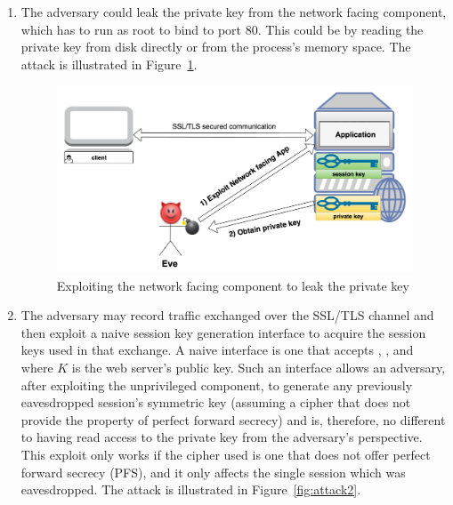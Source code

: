 \documentclass[../main.tex]{subfiles}
\begin{document}
\begin{enumerate}
  \item The adversary could leak the private key from the network facing
    component, which has to run as root to bind to port 80.  This could
    be by reading the private key from disk directly or from the
    process's memory space. The attack is illustrated in
    Figure~\ref{fig:attack1}.

	\begin{figure}[H]
          \centering
          \includegraphics[scale=0.15]{images/attack1.png}
          \caption{Exploiting the network facing component to leak the
            private key}
          \label{fig:attack1}
	\end{figure}

  \item The adversary may record traffic exchanged over the
    SSL/TLS channel and then exploit a naive session key
    generation interface to acquire the session keys used in that
    exchange. A naive interface is one that accepts \crandom,
    \srandom, and \premaster~ where $K$ is the web server's public
    key.  Such an interface allows an adversary, after exploiting
    the unprivileged component, to generate any previously
    eavesdropped session's symmetric key (assuming a cipher that
    does not provide the property of perfect forward secrecy) and
    is, therefore, no different to having read access to the
    private key from the adversary's perspective. This exploit
    only works if the cipher used is one that does not offer
    perfect forward secrecy (PFS), and it only affects the single
    session which was eavesdropped. The attack is illustrated in
    Figure~\ref{fig:attack2}.


\end{enumerate}
\end{document}
